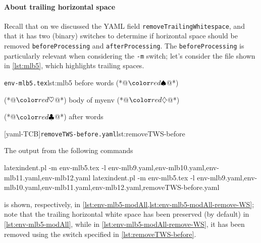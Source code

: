 	\paragraph{About trailing horizontal space}
	Recall that on  we discussed the YAML field \texttt{removeTrailingWhitespace},
	and that it has two (binary) switches to determine if horizontal space should be removed \texttt{beforeProcessing} and \texttt{afterProcessing}.
	The \texttt{beforeProcessing} is particularly relevant when considering the \texttt{-m} switch; let's consider the
	file shown in \cref{lst:mlb5}, which highlights trailing spaces.

	\begin{minipage}{.45\linewidth}
		\begin{cmhlistings}[showspaces=true,escapeinside={(*@}{@*)}]{\texttt{env-mlb5.tex}}{lst:mlb5}
before words   (*@$\BeginStartsOnOwnLine$@*) 
\begin{myenv}           (*@$\BodyStartsOnOwnLine$@*)
body of myenv      (*@$\EndStartsOnOwnLine$@*) 
\end{myenv}     (*@$\EndFinishesWithLineBreak$@*)
after words
\end{cmhlistings}
	\end{minipage}
	\hfill
	\begin{minipage}{.45\linewidth}
		[yaml-TCB]{\texttt{removeTWS-before.yaml}}{lst:removeTWS-before}
	\end{minipage}

	The output from the following commands
	\begin{sidebyside}
		\begin{commandshell}
latexindent.pl -m env-mlb5.tex -l env-mlb9.yaml,env-mlb10.yaml,env-mlb11.yaml,env-mlb12.yaml
latexindent.pl -m env-mlb5.tex -l env-mlb9.yaml,env-mlb10.yaml,env-mlb11.yaml,env-mlb12.yaml,removeTWS-before.yaml
\end{commandshell}
	\end{sidebyside}
	is shown, respectively, in \cref{lst:env-mlb5-modAll,lst:env-mlb5-modAll-remove-WS}; note that
	the trailing horizontal white space has been preserved (by default) in \cref{lst:env-mlb5-modAll}, while
	in \cref{lst:env-mlb5-modAll-remove-WS}, it has been removed using the switch specified in \cref{lst:removeTWS-before}.


